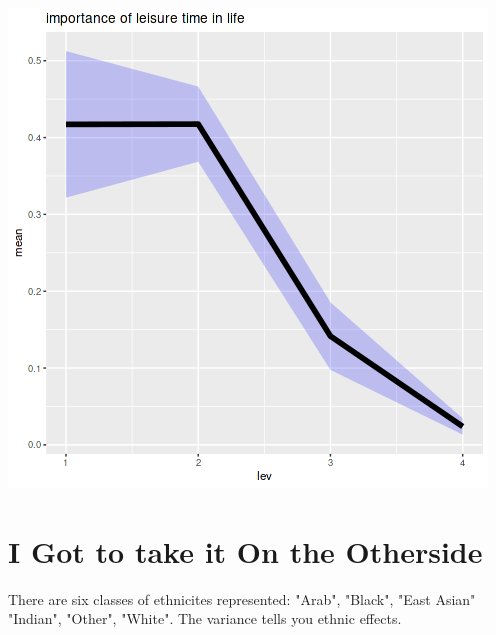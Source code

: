 \documentclass{amsart}
\begin{document}
\includegraphics[scale=0.6]{life_imp_leisure.png}


\section{I Got to take it On the Otherside}

There are six classes of ethnicites represented: "Arab", "Black", "East Asian" "Indian", "Other", "White".  The variance tells you ethnic effects.
\end{document}
